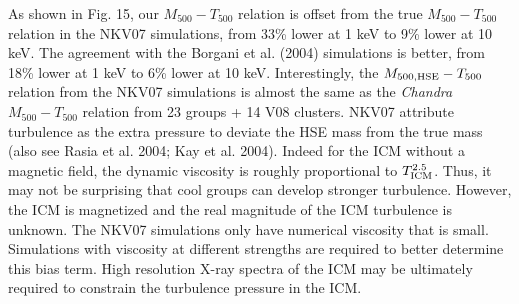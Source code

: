 \documentclass{aastex}
\def\chandra    {{\em Chandra}\/}
\begin{document}
As shown in Fig. 15, our $M_{500} - T_{500}$ relation is offset
from the true $M_{500} - T_{500}$ relation in the NKV07 simulations, from
33\% lower at 1 keV to 9\% lower at 10 keV. The agreement with the Borgani et al.
(2004) simulations is better, from 18\% lower at 1 keV to 6\% lower at 10 keV.
Interestingly, the $M_{\rm 500, HSE} - T_{500}$ relation from the NKV07
simulations is almost the same as the \chandra\ $M_{500} - T_{500}$ relation
from 23 groups + 14 V08 clusters. NKV07 attribute turbulence as the extra pressure
to deviate the HSE mass from the true mass (also see Rasia et al. 2004; Kay et al.
2004). Indeed for the ICM without a magnetic field, the dynamic
viscosity is roughly proportional to $T_{\rm ICM}^{2.5}$. Thus, it may not
be surprising that cool groups can develop stronger turbulence. However,
the ICM is magnetized and the real magnitude of the ICM turbulence is unknown.
The NKV07 simulations only have numerical viscosity that is small. 
Simulations with viscosity at different strengths are required to better
determine this bias term. High resolution X-ray spectra of the ICM may be
ultimately required to constrain the turbulence pressure in the ICM.
\end{document}
